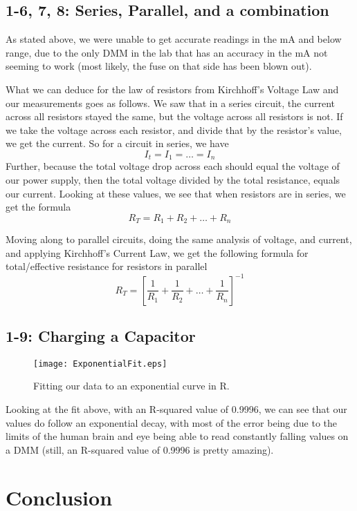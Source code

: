 \documentclass[%
 aip,
 jmp,
 amsmath,
 amssymb,
 reprint,%
 numerical,
 longbibliography,
]{revtex4-1}
\begin{document}
	\subsection{1-6, 7, 8: Series, Parallel, and a combination}
	
	As stated above, we were unable to get accurate readings in the mA and below range,
	due to the only DMM in the lab that has an accuracy in the mA not seeming to work
	(most likely, the fuse on that side has been blown out).
	
	What we can deduce for the law of resistors from Kirchhoff's Voltage Law and our
	measurements goes as follows. We saw that in a series circuit, the current across
	all resistors stayed the same, but the voltage across all resistors is not. If we
	take the voltage across each resistor, and divide that by the resistor's value, we
	get the current. So for a circuit in series, we have
	\[ I_t = I_1 = \dots = I_n \]
	Further, because the total voltage drop across each should equal the voltage of our
	power supply, then the total voltage divided by the total resistance, equals our
	current. Looking at these values, we see that when resistors are in series, we get
	the formula
	\[ R_T = R_1 + R_2 + \dots + R_n \]
	
	Moving along to parallel circuits, doing the same analysis of voltage, and current, 
	and applying Kirchhoff's Current Law, we get the following formula for total/effective
	resistance for resistors in parallel
	\[ R_T = [\frac{1}{R_1} + \frac{1}{R_2} + \dots + \frac{1}{R_n}]^{-1}\]
	
	\subsection{1-9: Charging a Capacitor}
	
	\begin{figure}[H]
	\texttt{[image: ExponentialFit.eps]}
	\caption{Fitting our data to an exponential curve in R.}
	\end{figure}
	
	Looking at the fit above, with an R-squared value of 0.9996, we can see that our values
	do follow an exponential decay, with most of the error being due to the limits of the 
	human brain and eye being able to read constantly falling values on a DMM (still, an
	R-squared value of 0.9996 is pretty amazing).

\section{Conclusion}
\end{document}
